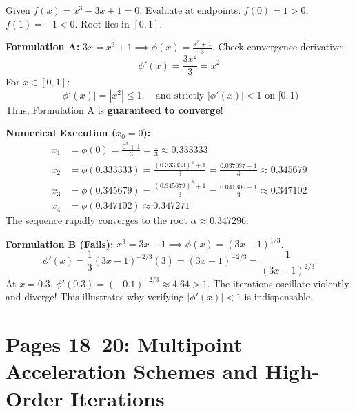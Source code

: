 \begin{examplebox}[Manuscript Problem: Iterative Selection for $x^3 - 3x + 1 = 0$ (Page 16)]
Given $f(x) = x^3 - 3x + 1 = 0$.
Evaluate at endpoints: $f(0) = 1 > 0$, $f(1) = -1 < 0$. Root lies in $[0, 1]$.

\textbf{Formulation A:} $3x = x^3 + 1 \implies \phi(x) = \frac{x^3 + 1}{3}$.
Check convergence derivative:
\begin{equation}
    \phi'(x) = \frac{3x^2}{3} = x^2
\end{equation}
For $x \in [0, 1]$:
\begin{equation}
    |\phi'(x)| = |x^2| \le 1, \quad \text{and strictly } |\phi'(x)| < 1 \text{ on } [0, 1)
\end{equation}
Thus, Formulation A is \textbf{guaranteed to converge}!

\textbf{Numerical Execution ($x_0 = 0$):}
\begin{align}
    x_1 &= \phi(0) = \frac{0^3 + 1}{3} = \frac{1}{3} \approx 0.333333 \\
    x_2 &= \phi(0.333333) = \frac{(0.333333)^3 + 1}{3} = \frac{0.037037 + 1}{3} \approx 0.345679 \\
    x_3 &= \phi(0.345679) = \frac{(0.345679)^3 + 1}{3} = \frac{0.041306 + 1}{3} \approx 0.347102 \\
    x_4 &= \phi(0.347102) \approx 0.347271
\end{align}
The sequence rapidly converges to the root $\alpha \approx 0.347296$.

\textbf{Formulation B (Fails):} $x^3 = 3x - 1 \implies \phi(x) = (3x - 1)^{1/3}$.
\begin{equation}
    \phi'(x) = \frac{1}{3}(3x - 1)^{-2/3}(3) = (3x - 1)^{-2/3} = \frac{1}{(3x - 1)^{2/3}}
\end{equation}
At $x = 0.3$, $\phi'(0.3) = (-0.1)^{-2/3} \approx 4.64 > 1$. The iterations oscillate violently and diverge! This illustrates why verifying $|\phi'(x)| < 1$ is indispensable.
\end{examplebox}

\section{Pages 18--20: Multipoint Acceleration Schemes and High-Order Iterations}
\label{sec:page18_20_acceleration}

